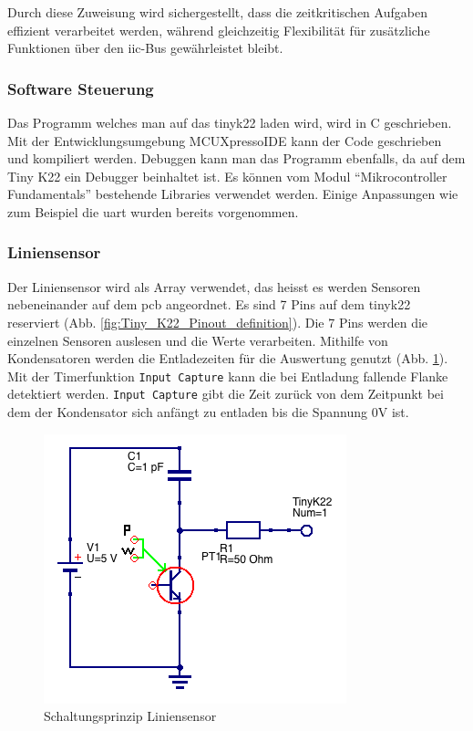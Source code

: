 Durch diese Zuweisung wird sichergestellt, dass die zeitkritischen Aufgaben effizient verarbeitet werden, während gleichzeitig Flexibilität für zusätzliche Funktionen über den \acrshort{iic}-Bus gewährleistet bleibt.

\subsubsection*{Software Steuerung}


Das Programm welches man auf das \gls{tinyk22} laden wird, wird in C geschrieben. Mit der Entwicklungsumgebung MCUXpressoIDE kann der Code geschrieben und kompiliert werden. Debuggen kann man das Programm ebenfalls, da auf dem Tiny K22 ein Debugger beinhaltet ist. Es können vom Modul ``Mikrocontroller Fundamentals'' bestehende Libraries verwendet werden. Einige Anpassungen wie zum Beispiel die \acrshort{uart} wurden bereits vorgenommen.

\subsubsection*{Liniensensor}


Der Liniensensor wird als Array verwendet, das heisst es werden Sensoren nebeneinander auf dem \acrshort{pcb} angeordnet. Es sind 7 Pins auf dem \gls{tinyk22} reserviert (Abb. \ref{fig:Tiny_K22_Pinout_definition}). Die 7 Pins werden die einzelnen Sensoren auslesen und die Werte verarbeiten. Mithilfe von Kondensatoren werden die Entladezeiten für die Auswertung genutzt (Abb. \ref{fig:Liniensensor_Schaltung}). Mit der Timerfunktion \verb|Input Capture| kann die bei Entladung fallende Flanke detektiert werden. \verb|Input Capture| gibt die Zeit zurück von dem Zeitpunkt bei dem der Kondensator sich anfängt zu entladen bis die Spannung 0V ist.

\begin{figure}[H]
    \centering
    \includegraphics[width=0.8\linewidth]{img/Liniensensor_Schaltung.png}
    \caption{Schaltungsprinzip Liniensensor}
    \label{fig:Liniensensor_Schaltung}
\end{figure}

